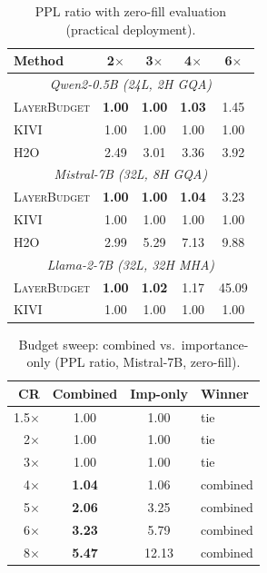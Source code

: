 \documentclass{article}
\newcommand{\layerbudget}{\textsc{LayerBudget}\xspace}
\begin{document}
\begin{table}[h]
\centering
\caption{PPL ratio with zero-fill evaluation (practical deployment).}
\label{tab:e2e}
\small
\setlength{\tabcolsep}{3pt}
\begin{tabular}{@{}lcccc@{}}
\toprule
Method & 2$\times$ & 3$\times$ & 4$\times$ & 6$\times$ \\
\midrule
\multicolumn{5}{c}{\textit{Qwen2-0.5B (24L, 2H GQA)}} \\
\midrule
\layerbudget & \textbf{1.00} & \textbf{1.00} & \textbf{1.03} & 1.45 \\
KIVI  & 1.00 & 1.00 & 1.00 & 1.00 \\
H2O   & 2.49 & 3.01 & 3.36 & 3.92 \\
\midrule
\multicolumn{5}{c}{\textit{Mistral-7B (32L, 8H GQA)}} \\
\midrule
\layerbudget & \textbf{1.00} & \textbf{1.00} & \textbf{1.04} & 3.23 \\
KIVI  & 1.00 & 1.00 & 1.00 & 1.00 \\
H2O   & 2.99 & 5.29 & 7.13 & 9.88 \\
\midrule
\multicolumn{5}{c}{\textit{Llama-2-7B (32L, 32H MHA)}} \\
\midrule
\layerbudget & \textbf{1.00} & \textbf{1.02} & 1.17 & 45.09 \\
KIVI  & 1.00 & 1.00 & 1.00 & 1.00 \\
\bottomrule
\end{tabular}
\end{table}

\begin{table}[h]
\centering
\caption{Budget sweep: combined vs.\ importance-only (PPL ratio, Mistral-7B, zero-fill).}
\label{tab:ablation_sweep}
\small
\begin{tabular}{@{}rccl@{}}
\toprule
CR & Combined & Imp-only & Winner \\
\midrule
1.5$\times$ & 1.00 & 1.00 & tie \\
2$\times$   & 1.00 & 1.00 & tie \\
3$\times$   & 1.00 & 1.00 & tie \\
4$\times$   & \textbf{1.04} & 1.06 & combined \\
5$\times$   & \textbf{2.06} & 3.25 & combined \\
6$\times$   & \textbf{3.23} & 5.79 & combined \\
8$\times$   & \textbf{5.47} & 12.13 & combined \\
\bottomrule
\end{tabular}
\end{table}
\end{document}
